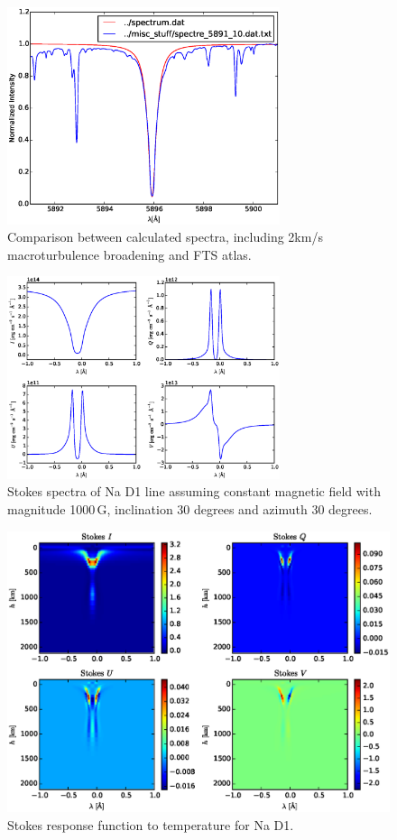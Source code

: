\documentclass[a4paper,10pt]{article}
\begin{document}
\begin{figure}
 \includegraphics[width=8cm]{Na_test.eps}
 \caption{Comparison between calculated spectra, including 2km/s macroturbulence broadening and FTS atlas.}
\end{figure}
\begin{figure}
 \includegraphics[width=8cm]{Na_stokes_stokes_spectrum.eps}
 \caption{Stokes spectra of Na D1 line assuming constant magnetic field with magnitude 1000\,G, inclination 30 degrees and azimuth 30 degrees.}
\end{figure}
\begin{figure}
 \includegraphics[width=\textwidth]{Na_stokes_analytical_responses_intensity_temperature.eps}
 \caption{Stokes response function to temperature for Na D1.}
\end{figure}
\end{document}
